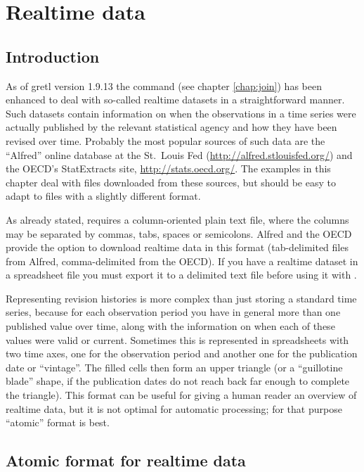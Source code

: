 \chapter{Realtime data}
\label{chap:realtime}

\section{Introduction}
\label{sec:realtime-intro}

As of gretl version 1.9.13 the  command (see chapter
\ref{chap:join}) has been enhanced to deal with so-called realtime
datasets in a straightforward manner.  Such datasets contain
information on when the observations in a time series were actually
published by the relevant statistical agency and how they have been
revised over time. Probably the most popular sources of such data are
the ``Alfred'' online database at the St.\ Louis Fed
(\url{http://alfred.stlouisfed.org/}) and the OECD's
\textsf{StatExtracts} site, \url{http://stats.oecd.org/}.  The
examples in this chapter deal with files downloaded from these
sources, but should be easy to adapt to files with a slightly
different format.

As already stated,  requires a column-oriented plain text
file, where the columns may be separated by commas, tabs, spaces or
semicolons. Alfred and the OECD provide the option to download
realtime data in this format (tab-delimited files from Alfred,
comma-delimited from the OECD). If you have a realtime dataset in a
spreadsheet file you must export it to a delimited text file before
using it with .

Representing revision histories is more complex than just storing a
standard time series, because for each observation period you have in
general more than one published value over time, along with the
information on when each of these values were valid or
current. Sometimes this is represented in spreadsheets with two time
axes, one for the observation period and another one for the
publication date or ``vintage''. The filled cells then form an upper
triangle (or a ``guillotine blade'' shape, if the publication dates do
not reach back far enough to complete the triangle). This format can
be useful for giving a human reader an overview of realtime data, but
it is not optimal for automatic processing; for that purpose
``atomic'' format is best.

\section{Atomic format for realtime data}
\label{sec:realtime-atomic}

